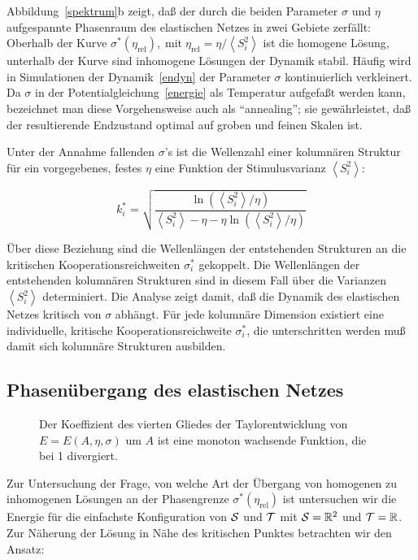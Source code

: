 Abbildung~\ref{spektrum}b zeigt, daß der durch die beiden
Parameter $\sigma$ und $\eta$ aufgespannte Phasenraum des elastischen
Netzes in zwei Gebiete zerfällt: Oberhalb der Kurve
$\sigma^\ast(\eta_{\text{rel}}),\;\text{mit}\;
\eta_{\text{rel}}=\eta/\left<S_i^2\right>$ ist die homogene Lösung,
unterhalb der Kurve sind inhomogene Lösungen der Dynamik stabil.
Häufig wird in Simulationen der Dynamik~\eqref{endyn} der Parameter
$\sigma$ kontinuierlich verkleinert. Da $\sigma$ in der
Potentialgleichung~\eqref{energie} als Temperatur aufgefaßt werden kann,
bezeichnet man diese Vorgehensweise auch als ``annealing''; sie
gewährleistet, daß der resultierende Endzustand optimal auf groben und
feinen Skalen ist.

Unter der Annahme fallenden $\sigma$'s ist die Wellenzahl einer kolumnären
Struktur für ein vorgegebenes, festes $\eta$ eine Funktion der
Stimulusvarianz $\left<S_i^2\right>$:

\begin{equation}
    k_i^\ast = \sqrt{\frac{\ln\left(\left<S_i^2\right>/\eta\right)}{\left<S_i^2
        \right>-\eta-\eta\ln\left(\left<S_i^2\right>/\eta\right)} }
    \label{k_of_var}
\end{equation}

Über diese Beziehung sind die Wellenlängen der entstehenden Strukturen an die
kritischen Kooperationsreichweiten $\sigma^\ast_i$ gekoppelt. Die
Wellenlängen der entstehenden kolumnären Strukturen sind in diesem
Fall über die Varianzen $\left<S_i^2\right>$ determiniert. Die Analyse
zeigt damit, daß die Dynamik des
elastischen Netzes kritisch von $\sigma$ abhängt. Für jede
kolumnäre Dimension existiert eine individuelle, kritische
Kooperationsreichweite $\sigma^\ast_i$, die unterschritten werden muß
damit sich kolumnäre Strukturen ausbilden.

\subsection{Phasenübergang des elastischen Netzes}

\begin{figure}[t]
    \centering
    \caption{Der Koeffizient des vierten Gliedes der Taylorentwicklung von
        $E=E(A,\eta,\sigma)$ um $A$ ist eine monoton
        wachsende Funktion, die bei 1 divergiert.}
    \label{koeffizient}
\end{figure}

Zur Untersuchung der Frage, von welche Art der Übergang von homogenen zu
inhomogenen Lösungen an der Phasengrenze $\sigma^\ast(\eta_{\text{rel}})$
ist untersuchen wir die Energie für die einfachste Konfiguration von $\cal
S$ und $\cal T$ mit ${\cal S} =\mathbb{R}^2$ und ${\cal T}=\mathbb{R}$. Zur
Näherung der Lösung in Nähe des kritischen Punktes betrachten wir den
Ansatz:

